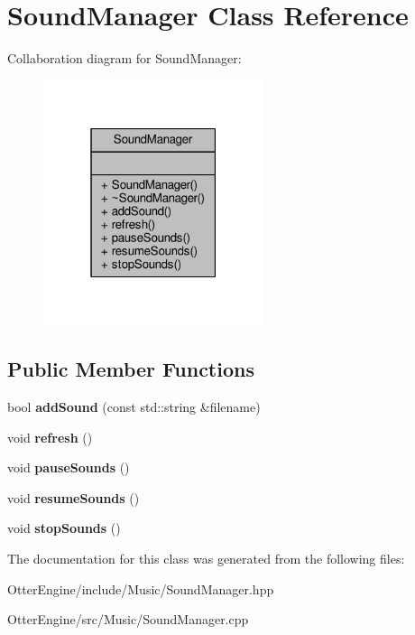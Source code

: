\hypertarget{class_sound_manager}{}\section{Sound\+Manager Class Reference}
\label{class_sound_manager}


Collaboration diagram for Sound\+Manager\+:\nopagebreak
\begin{figure}[H]
\begin{center}
\leavevmode
\includegraphics[width=183pt]{d3/da9/class_sound_manager__coll__graph}
\end{center}
\end{figure}
\subsection*{Public Member Functions}
\begin{DoxyCompactItemize}
\item 
bool {\bfseries add\+Sound} (const std\+::string \&filename)\hypertarget{class_sound_manager_a4dab3bb0f69dc0a5255a93f3bf235de0}{}\label{class_sound_manager_a4dab3bb0f69dc0a5255a93f3bf235de0}

\item 
void {\bfseries refresh} ()\hypertarget{class_sound_manager_a2f435770a9a96768af85de519e3bda0e}{}\label{class_sound_manager_a2f435770a9a96768af85de519e3bda0e}

\item 
void {\bfseries pause\+Sounds} ()\hypertarget{class_sound_manager_aabae61cda466e8ed0e72492d45ad001c}{}\label{class_sound_manager_aabae61cda466e8ed0e72492d45ad001c}

\item 
void {\bfseries resume\+Sounds} ()\hypertarget{class_sound_manager_ad5ea7cb5de28c717f82b98c6eda37457}{}\label{class_sound_manager_ad5ea7cb5de28c717f82b98c6eda37457}

\item 
void {\bfseries stop\+Sounds} ()\hypertarget{class_sound_manager_a8472e76e0abcdfeb981cdb55cec9d173}{}\label{class_sound_manager_a8472e76e0abcdfeb981cdb55cec9d173}

\end{DoxyCompactItemize}


The documentation for this class was generated from the following files\+:\begin{DoxyCompactItemize}
\item 
Otter\+Engine/include/\+Music/Sound\+Manager.\+hpp\item 
Otter\+Engine/src/\+Music/Sound\+Manager.\+cpp\end{DoxyCompactItemize}
